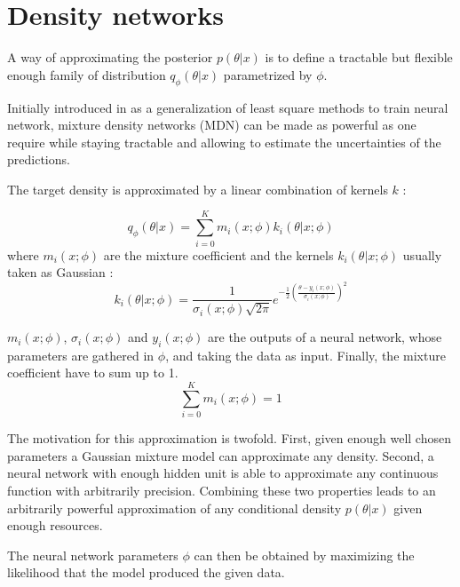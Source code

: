 \section{Density networks} %
\label{sec:density_networks}



A way of approximating the posterior $p(\theta | x)$ is to define a tractable but flexible enough family of distribution $q_\phi(\theta | x)$ parametrized by $\phi$.

Initially introduced in \cite{Bishop94mixturedensity} as a generalization of least square methods to train neural network, mixture density networks (MDN) can be made as powerful as one require while staying tractable and allowing to estimate the uncertainties of the predictions.

The target density is approximated by a linear combination of kernels $k$ :

\begin{equation}
    q_\phi(\theta | x) = \sum_{i=0}^K m_i(x ; \phi) k_i(\theta | x ; \phi)
\end{equation}
where $m_i(x ; \phi)$ are the mixture coefficient
and the kernels $k_i(\theta | x ; \phi)$ usually taken as Gaussian :
\begin{equation}
    k_i(\theta | x ; \phi) = \frac{1}{\sigma_i(x ; \phi) \sqrt{2 \pi}} e^{- \frac{1}{2} \left ( \frac{\theta-y_i(x ; \phi)}{\sigma_i(x ; \phi)} \right )^2} 
\end{equation}

$m_i(x ; \phi)$, $\sigma_i(x ; \phi)$ and $y_i(x ; \phi)$ are the outputs of a neural network, whose parameters are gathered in $\phi$, and taking the data as input.
Finally, the mixture coefficient have to sum up to 1.
\begin{equation}
    \sum_{i=0}^K m_i(x ; \phi) =  1
\end{equation}

The motivation for this approximation is twofold.
First, given enough well chosen parameters a Gaussian mixture model can approximate any density.
Second, a neural network with enough hidden unit is able to approximate any continuous function with arbitrarily precision.
Combining these two properties leads to an arbitrarily powerful approximation of any conditional density $p(\theta|x)$ given enough resources.

The neural network parameters $\phi$ can then be obtained by maximizing the likelihood that the model produced the given data.

